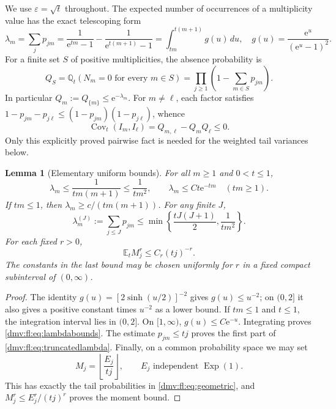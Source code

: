 \documentclass[11pt,letterpaper]{article}
\numberwithin{equation}{section}
\newtheorem{lemma}[theorem]{Lemma}
\theoremstyle{definition}\newtheorem{definition}[theorem]{Definition}
\theoremstyle{remark}\newtheorem{remark}[theorem]{Remark}
\newcommand{\E}{\mathbb E}
\newcommand{\ee}{\mathrm e}
\newcommand{\Q}{\mathbb Q}
\newcommand{\eps}{\varepsilon}
\DeclareMathOperator{\Cov}{Cov}
\begin{document}
We use $\eps=\sqrt t$ throughout. The expected number of occurrences
of a multiplicity value has the exact telescoping form
\begin{equation}\label{dmv:fl:eq:lambda}
 \lambda_m=\sum_jp_{jm}
 =\frac1{\ee^{tm}-1}-\frac1{\ee^{t(m+1)}-1}
 =\int_{tm}^{t(m+1)}g(u)\,du,
 \quad g(u)=\frac{\ee^u}{(\ee^u-1)^2}.
\end{equation}
For a finite set $S$ of positive multiplicities, the absence probability is
\begin{equation}\label{dmv:fl:eq:absence}
 Q_S=\Q_t(N_m=0\text{ for every }m\in S)
 =\prod_{j\ge1}\left(1-\sum_{m\in S}p_{jm}\right).
\end{equation}
In particular $Q_m:=Q_{\{m\}}\le\ee^{-\lambda_m}$. For $m\ne\ell$,
each factor satisfies
$1-p_{jm}-p_{j\ell}\le(1-p_{jm})(1-p_{j\ell})$, whence
\begin{equation}\label{dmv:fl:eq:negativecov}
 \Cov_t(I_m,I_\ell)=Q_{m,\ell}-Q_mQ_\ell\le0.
\end{equation}
Only this explicitly proved pairwise fact is needed for the weighted
tail variances below.

\begin{lemma}[Elementary uniform bounds]\label{dmv:fl:lem:basicbounds}
For all $m\ge1$ and $0<t\le1$,
\begin{equation}\label{dmv:fl:eq:lambdabounds}
 \lambda_m\le\frac1{tm(m+1)}\le\frac1{tm^2},\qquad
 \lambda_m\le C t\ee^{-tm}\quad(tm\ge1).
\end{equation}
If $tm\le1$, then
$\lambda_m\ge c/(tm(m+1))$. For any finite $J$,
\begin{equation}\label{dmv:fl:eq:truncatedlambda}
 \lambda_m^{(J)}:=\sum_{j\le J}p_{jm}
 \le\min\left\{\frac{tJ(J+1)}2,\frac1{tm^2}\right\}.
\end{equation}
For each fixed $r>0$,
\begin{equation}\label{dmv:fl:eq:momentbound}
 \E_t M_j^r\le C_r(tj)^{-r}.
\end{equation}
The constants in the last bound may be chosen uniformly for $r$ in a
fixed compact subinterval of $(0,\infty)$.
\end{lemma}
\begin{proof}
The identity $g(u)=[2\sinh(u/2)]^{-2}$ gives $g(u)\le u^{-2}$;
on $(0,2]$ it also gives a positive constant times $u^{-2}$ as a lower
bound. If $tm\le1$ and $t\le1$, the integration interval lies in
$(0,2]$. On $[1,\infty)$, $g(u)\le C\ee^{-u}$. Integrating proves
\eqref{dmv:fl:eq:lambdabounds}. The estimate $p_{jm}\le tj$ proves the first
part of \eqref{dmv:fl:eq:truncatedlambda}. Finally, on a common probability
space we may set
\begin{equation}\label{dmv:fl:eq:expcoupling}
 M_j=\left\lfloor\frac{E_j}{tj}\right\rfloor,
 \qquad E_j\text{ independent }\operatorname{Exp}(1).
\end{equation}
This has exactly the tail probabilities in \eqref{dmv:fl:eq:geometric}, and
$M_j^r\le E_j^r/(tj)^r$ proves the moment bound.
\end{proof}
\end{document}
